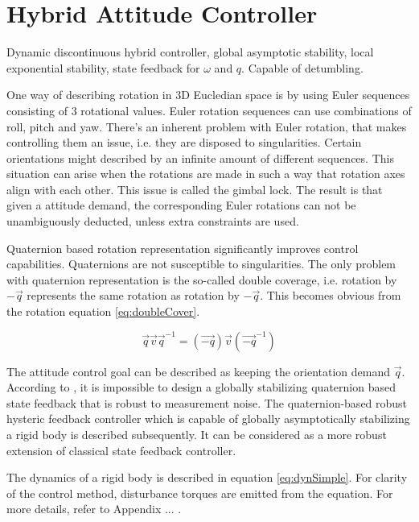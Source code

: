 \section{Hybrid Attitude Controller}

Dynamic discontinuous hybrid controller, global asymptotic stability, local exponential stability, state feedback for $\omega$ and $q$. Capable of detumbling. \cite{globalAttController}

One way of describing rotation in 3D Eucledian space is by using Euler sequences consisting of 3 rotational values. Euler rotation sequences can use combinations of roll, pitch and yaw. There's an inherent problem with Euler rotation, that makes controlling them an issue, i.e. they are disposed to singularities. Certain orientations might described by an infinite amount of different sequences. This situation can arise when the rotations are made in such a way that rotation axes align with each other. This issue is called the gimbal lock. The result is that given a attitude demand, the corresponding Euler rotations can not be unambiguously deducted, unless extra constraints are used.

Quaternion based rotation representation significantly improves control capabilities. Quaternions are not susceptible to singularities. The only problem with quaternion representation is the so-called double coverage, i.e. rotation by $-\vec{q}$ represents the same rotation as rotation by $-\vec{q}$. This becomes obvious from the rotation equation \ref{eq:doubleCover}.

\begin{equation}
\label{eq:doubleCover}
\vec{q} \vec{v} \vec{q}^{-1} = 	(\vec{-q}) \vec{v} (\vec{-q}^{-1})
\end{equation} 

The attitude control goal can be described as keeping the orientation demand $\vec{q}$. According to  \cite{globalAttController}, it is impossible to design a globally stabilizing quaternion based state feedback that is robust to measurement noise. The quaternion-based robust hysteric feedback controller which is capable of globally asymptotically stabilizing a rigid body is described subsequently. It can be considered as a more robust extension of classical state feedback controller.

The dynamics of a rigid body is described in equation \ref{eq:dynSimple}. For clarity of the control method, disturbance torques are emitted from the equation. For more details, refer to Appendix ... .

